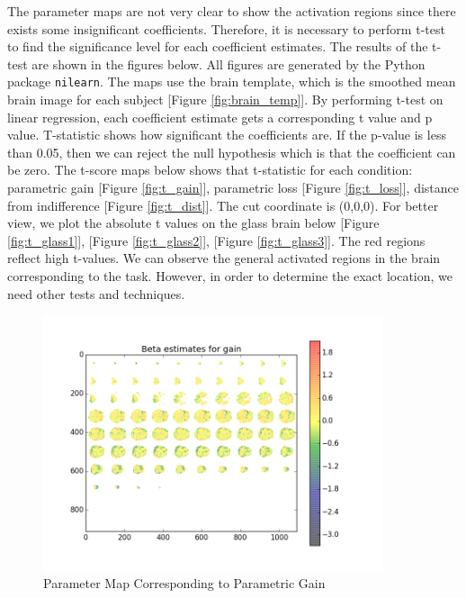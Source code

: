 \par \indent The parameter maps are not very clear to show the activation 
regions since there exists some insignificant coefficients. Therefore, it is 
necessary to perform t-test to find the significance level for each coefficient 
estimates. The results of the t-test are shown in the figures below. All 
figures are generated by the Python package \texttt{nilearn}. The maps use the 
brain template, which is the smoothed mean brain image for each subject
[Figure \ref{fig:brain_temp}]. By performing t-test on linear regression, each 
coefficient estimate gets a corresponding t value and p value. T-statistic 
shows how significant the coefficients are. If the p-value is less than 0.05, 
then we can reject the null hypothesis which is that the coefficient can be 
zero. The t-score maps below shows that t-statistic for each condition: 
parametric gain [Figure \ref{fig:t_gain}], parametric loss 
[Figure \ref{fig:t_loss}], distance from indifference [Figure \ref{fig:t_dist}].
The cut coordinate is (0,0,0). For better view, we plot the absolute t values on
the glass brain below [Figure \ref{fig:t_glass1}], [Figure \ref{fig:t_glass2}], 
[Figure \ref{fig:t_glass3}]. The red regions reflect high t-values. We can 
observe the general activated regions in the brain corresponding to the task. 
However, in order to determine the exact location, we need other tests and 
techniques.

\begin{figure}[h!]
\centering
\includegraphics[width=100mm]{images/parameter_map_gain.png}               
\caption{Parameter Map Corresponding to Parametric Gain}
\label{fig:beta1}
\end{figure}

